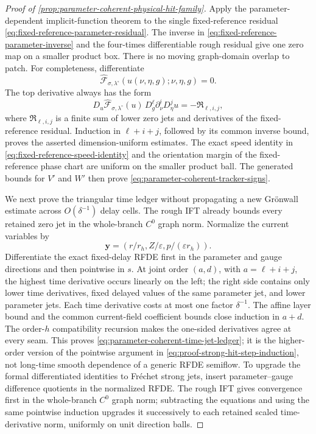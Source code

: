 \begin{proof}[Proof of
\cref{prop:parameter-coherent-physical-hit-family}]
Apply the parameter-dependent implicit-function theorem to the single
fixed-reference residual
\cref{eq:fixed-reference-parameter-residual}.  The inverse in
\cref{eq:fixed-reference-parameter-inverse} and the four-times
differentiable rough residual give one zero map on a smaller product box.
There is no moving graph-domain overlap to patch.  For completeness,
differentiate
\[
 \widehat{\mathcal F}_{\sigma,\lambda^\circ}
       (u(\nu,\eta,g);\nu,\eta,g)=0.
\]
The top derivative always has the form
\begin{equation}
 D_u\widehat{\mathcal F}_{\sigma,\lambda^\circ}(u)\,
     D_g^\ell\partial_\nu^iD_\eta^ju
 =-\mathfrak R_{\ell,i,j},                       \label{eq:proof-parameter-zero-induction}
\end{equation}
where \(\mathfrak R_{\ell,i,j}\) is a finite sum of lower zero jets and
derivatives of the fixed-reference residual.  Induction in
\(\ell+i+j\), followed by its common inverse bound, proves the asserted
dimension-uniform estimates.  The exact speed identity in
\cref{eq:fixed-reference-speed-identity} and the orientation margin of the
fixed-reference phase chart are uniform on the smaller product ball.  The
generated bounds for $V'$ and $W'$ then prove
\cref{eq:parameter-coherent-tracker-signs}.

We next prove the triangular time ledger without propagating a new
Gr\"onwall estimate across $O(\delta^{-1})$ delay cells.  The rough IFT
already bounds every retained zero jet in the whole-branch $C^0$ graph
norm.  Normalize the current variables by
\[
 \mathbf y=(r/r_h,Z/\varepsilon,p/(\varepsilon r_h)).
\]
Differentiate the exact fixed-delay RFDE first in the parameter and gauge
directions and then pointwise in $s$.  At joint order $(a,d)$, with
$a=\ell+i+j$, the highest time derivative occurs linearly on the left; the
right side contains only lower time derivatives, fixed delayed values of
the same parameter jet, and lower parameter jets.  Each time derivative
costs at most one factor $\delta^{-1}$.  The affine layer bound and the
common current-field coefficient bounds close induction in $a+d$.  The
order-$h$ compatibility recursion makes the one-sided derivatives agree at
every seam.  This proves
\cref{eq:parameter-coherent-time-jet-ledger}; it is the higher-order version
of the pointwise argument in
\cref{eq:proof-strong-hit-step-induction}, not long-time smooth dependence
of a generic RFDE semiflow.  To upgrade the formal differentiated
identities to Fr\'{e}chet strong jets, insert parameter--gauge difference
quotients in the normalized RFDE.  The rough IFT gives convergence first
in the whole-branch $C^0$ graph norm; subtracting the equations and using
the same pointwise induction upgrades it successively to each retained
scaled time-derivative norm, uniformly on unit direction balls.


\end{proof}
